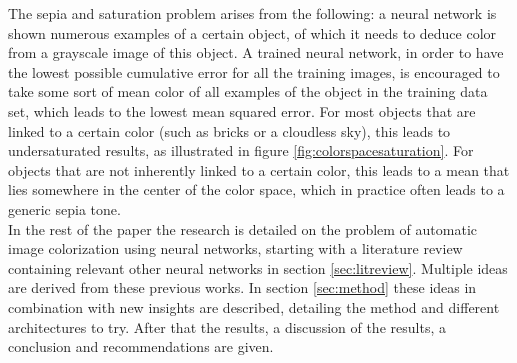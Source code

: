 The sepia and saturation problem arises from the following: a neural network is shown numerous examples of a certain object, of which it needs to deduce color from a grayscale image of this object. 
A trained neural network, in order to have the lowest possible cumulative error for all the training images, is encouraged to take some sort of mean color of all examples of the object in the training data set, which leads to the lowest mean squared error. For most objects that are linked to a certain color (such as bricks or a cloudless sky), this leads to undersaturated results, as illustrated in figure \ref{fig:colorspacesaturation}. 
For objects that are not inherently linked to a certain color, this leads to a mean that lies somewhere in the center of the color space, which in practice often leads to a generic sepia tone.\\
	
In the rest of the paper the research is detailed on the problem of automatic image colorization using neural networks, starting with a literature review containing relevant other neural networks in section \ref{sec:litreview}. Multiple ideas are derived from these previous works. In section \ref{sec:method} these ideas in combination with new insights are described, detailing the method and different architectures to try. After that the results, a discussion of the results, a conclusion and recommendations are given.
	
	




